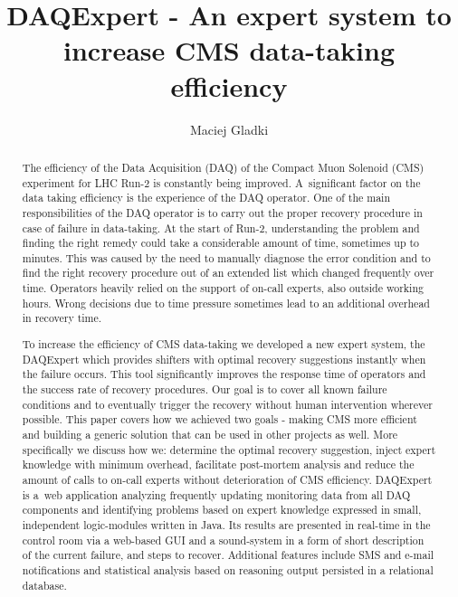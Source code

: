 \documentclass[a4paper]{jpconf}
\begin{document}
\title{DAQExpert - An expert system to increase CMS data-taking efficiency}

\author{Maciej Gladki}

\address{on behalf of the CMS Collaboration, CERN, Switzerland}


\begin{abstract}
The efficiency of the Data Acquisition (DAQ) of the Compact Muon Solenoid (CMS) experiment for LHC Run-2 is constantly being improved. A~significant factor on the data taking efficiency is the experience of the DAQ operator. One of the main responsibilities of the DAQ operator is to carry out the proper recovery procedure in case of failure in data-taking. At the start of Run-2, understanding the problem and finding the right remedy could take a considerable amount of time, sometimes up to minutes. This was caused by the need to manually diagnose the error condition and to find the right recovery procedure out of an extended list which changed frequently over time. Operators heavily relied on the support of on-call experts, also outside working hours. Wrong decisions due to time pressure sometimes lead to an additional overhead in recovery time.

To increase the efficiency of CMS data-taking we developed a new expert system, the DAQExpert which provides shifters with optimal recovery suggestions instantly when the failure occurs. This tool significantly improves the response time of operators and the success rate of recovery procedures. Our goal is to cover all known failure conditions and to eventually trigger the recovery without human intervention wherever possible. This paper covers how we achieved two goals - making CMS more efficient and building a generic solution that can be used in other projects as well. More specifically we discuss how we: determine the optimal recovery suggestion, inject expert knowledge with minimum overhead, facilitate post-mortem analysis and reduce the amount of calls to on-call experts without deterioration of CMS efficiency. DAQExpert is a~web application analyzing frequently updating monitoring data from all DAQ components and identifying problems based on expert knowledge expressed in small, independent logic-modules written in Java. Its results are presented in real-time in the control room via a web-based GUI and a sound-system in a form of short description of the current failure, and steps to recover. Additional features include SMS and e-mail notifications and statistical analysis based on reasoning output persisted in a relational database.
\end{abstract}
\end{document}
